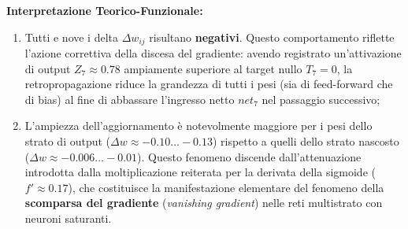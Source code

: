 \begin{table}[H]
\centering
\caption{Quadro sinottico finale dell'aggiornamento dei 9 pesi sinaptici mediante Backpropagation.}
\label{tab:dm-backprop-final-weights}
\vspace{2mm}
\end{table}

\textbf{Interpretazione Teorico-Funzionale:}
\begin{enumerate}
    \item Tutti e nove i delta $\Delta w_{ij}$ risultano \textbf{negativi}. Questo comportamento riflette l'azione correttiva della discesa del gradiente: avendo registrato un'attivazione di output $Z_7 \approx 0.78$ ampiamente superiore al target nullo $T_7 = 0$, la retropropagazione riduce la grandezza di tutti i pesi (sia di feed-forward che di bias) al fine di abbassare l'ingresso netto $net_7$ nel passaggio successivo;
    \item L'ampiezza dell'aggiornamento è notevolmente maggiore per i pesi dello strato di output ($\Delta w \approx -0.10 \dots -0.13$) rispetto a quelli dello strato nascosto ($\Delta w \approx -0.006 \dots -0.01$). Questo fenomeno discende dall'attenuazione introdotta dalla moltiplicazione reiterata per la derivata della sigmoide ($f' \approx 0.17$), che costituisce la manifestazione elementare del fenomeno della \textbf{scomparsa del gradiente} (\textit{vanishing gradient}) nelle reti multistrato con neuroni saturanti.
\end{enumerate}
